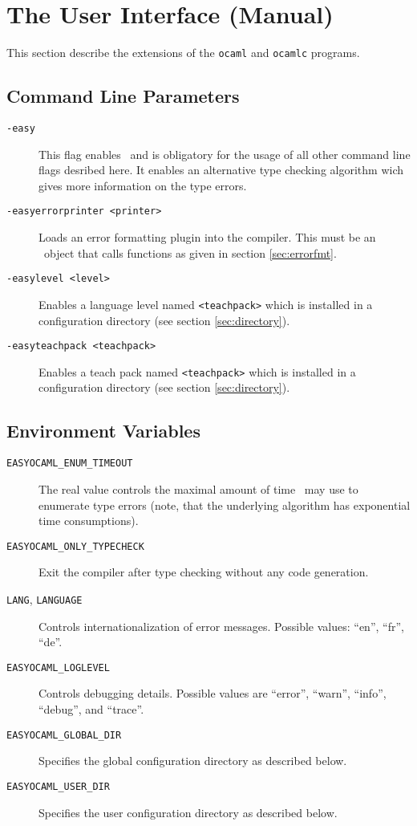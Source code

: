 
\section{The User Interface (Manual)}
\label{sec:manual}

This section describe the extensions of the \texttt{ocaml} and \texttt{ocamlc} programs.

\subsection{Command Line Parameters}
\label{sec:commandlineflags}

\begin{description}
  \item[\texttt{-easy}] This flag enables \easyocaml\ and is obligatory for
    the usage of all other command line flags desribed here.
    It enables an alternative type checking algorithm wich gives more
    information on the type errors.
  \item[\texttt{-easyerrorprinter <printer>}] Loads an error formatting plugin
    into the compiler. This must be an \ocaml\ object that calls functions as
    given in section \ref{sec:errorfmt}.
  \item[\texttt{-easylevel <level>}] Enables a language level named
    \texttt{<teachpack>} which is installed in a configuration directory (see
    section \ref{sec:directory}).
  \item[\texttt{-easyteachpack <teachpack>}] Enables a teach pack named
    \texttt{<teachpack>} which is installed in a configuration directory (see
    section \ref{sec:directory}).
\end{description}

\subsection{Environment Variables}
\label{sec:envvars}

\begin{description}
  \item[\texttt{EASYOCAML\_ENUM\_TIMEOUT}] \label{man:timeout}
    The real value controls the maximal amount of
    time \easyocaml\ may use to enumerate type errors (note, that the underlying algorithm
    has exponential time consumptions).
  \item[\texttt{EASYOCAML\_ONLY\_TYPECHECK}] Exit the compiler after type checking without any code generation.
  \item[\texttt{LANG}, \texttt{LANGUAGE}]  Controls internationalization of error messages. Possible
    values: ``en'', ``fr'', ``de''.
  \item[\texttt{EASYOCAML\_LOGLEVEL}] Controls debugging details. Possible values are ``error'', ``warn'', ``info'', ``debug'', and ``trace''.
  \item[\texttt{EASYOCAML\_GLOBAL\_DIR}] Specifies the global configuration directory as described below.
  \item[\texttt{EASYOCAML\_USER\_DIR}] Specifies the user configuration directory as described below.
\end{description}

